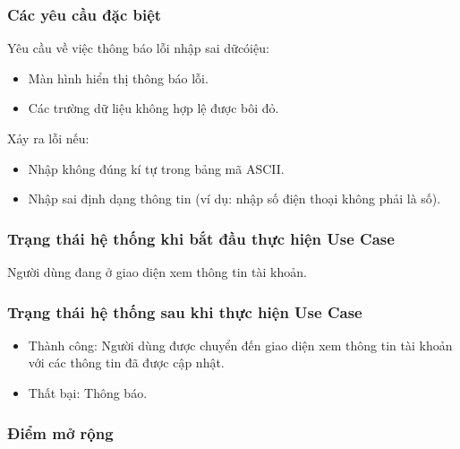 \subsubsection{Các yêu cầu đặc biệt}
    \item Yêu cầu về việc thông báo lỗi nhập sai dữcóiệu:
    \begin{itemize}
        \item Màn hình hiển thị thông báo lỗi.
        \item Các trường dữ liệu không hợp lệ được bôi đỏ.
    \end{itemize}
    \item Xảy ra lỗi nếu:
    \begin{itemize}
        \item Nhập không đúng kí tự trong bảng mã ASCII.
        \item Nhập sai định dạng thông tin (ví dụ: nhập số điện thoại không phải là số).
\end{itemize}

\subsubsection{Trạng thái hệ thống khi bắt đầu thực hiện Use Case}
Người dùng đang ở giao diện xem thông tin tài khoản.

\subsubsection{Trạng thái hệ thống sau khi thực hiện Use Case}
\begin{itemize}
    \item Thành công: Người dùng được chuyển đến giao diện xem thông tin tài khoản với các thông tin đã được cập nhật.
    \item Thất bại: Thông báo.
\end{itemize}

\subsubsection{Điểm mở rộng}